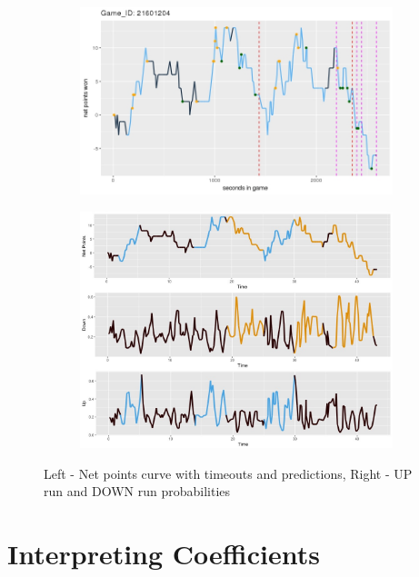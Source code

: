 \documentclass{article}
\begin{document}
\begin{figure}[h]
\centering
\begin{subfigure}{.5\textwidth}
  \centering
  \includegraphics[width=\linewidth]{Net_Point_21601204.jpeg}
  \label{fig:sub1}
\end{subfigure}%
\begin{subfigure}{.5\textwidth}
  \centering
  \includegraphics[width=\linewidth]{Probability_Plot.jpeg}
  \label{fig:sub2}
\end{subfigure}
\caption{Left - Net points curve with timeouts and predictions, Right - UP run and DOWN run probabilities}
\label{fig:test}
\end{figure}



\section{Interpreting Coefficients}
\end{document}
